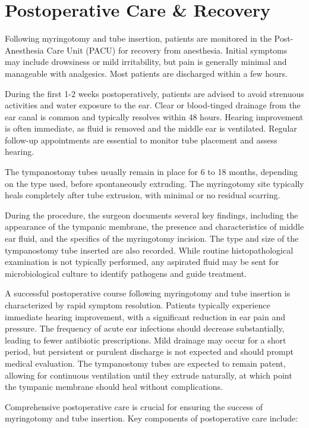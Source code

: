 \section*{Postoperative Care \& Recovery}
Following myringotomy and tube insertion, patients are monitored in the Post-Anesthesia Care Unit (PACU) for recovery from anesthesia. Initial symptoms may include drowsiness or mild irritability, but pain is generally minimal and manageable with analgesics. Most patients are discharged within a few hours.

During the first 1-2 weeks postoperatively, patients are advised to avoid strenuous activities and water exposure to the ear. Clear or blood-tinged drainage from the ear canal is common and typically resolves within 48 hours. Hearing improvement is often immediate, as fluid is removed and the middle ear is ventilated. Regular follow-up appointments are essential to monitor tube placement and assess hearing.

The tympanostomy tubes usually remain in place for 6 to 18 months, depending on the type used, before spontaneously extruding. The myringotomy site typically heals completely after tube extrusion, with minimal or no residual scarring.

During the procedure, the surgeon documents several key findings, including the appearance of the tympanic membrane, the presence and characteristics of middle ear fluid, and the specifics of the myringotomy incision. The type and size of the tympanostomy tube inserted are also recorded. While routine histopathological examination is not typically performed, any aspirated fluid may be sent for microbiological culture to identify pathogens and guide treatment.

A successful postoperative course following myringotomy and tube insertion is characterized by rapid symptom resolution. Patients typically experience immediate hearing improvement, with a significant reduction in ear pain and pressure. The frequency of acute ear infections should decrease substantially, leading to fewer antibiotic prescriptions. Mild drainage may occur for a short period, but persistent or purulent discharge is not expected and should prompt medical evaluation. The tympanostomy tubes are expected to remain patent, allowing for continuous ventilation until they extrude naturally, at which point the tympanic membrane should heal without complications.

Comprehensive postoperative care is crucial for ensuring the success of myringotomy and tube insertion. Key components of postoperative care include:

